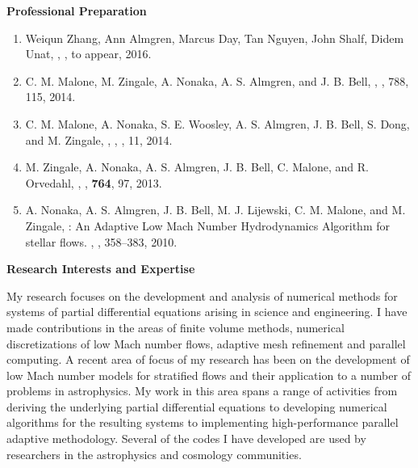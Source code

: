 \documentclass[11pt,letterpaper,english]{article}
\begin{document}
\begin{flushleft} {\bf Professional Preparation}
\begin{enumerate}
\item Weiqun Zhang, Ann Almgren, Marcus Day, Tan Nguyen, John Shalf, Didem Unat, 
, , to appear, 2016. \\

\item C. M. Malone, M. Zingale, A. Nonaka, A. S. Almgren, and J. B. Bell, 
,
, 788, 115, 2014. \\ 

\item C. M. Malone, A. Nonaka, S. E. Woosley, A. S. Almgren, J. B. Bell, S. Dong, and M. Zingale, 
,
, , 11, 2014.  \\ 

\item M. Zingale, A. Nonaka, A. S. Almgren, J. B. Bell, C. Malone, and R. Orvedahl, 
, 
, 
{\bf 764}, 97, 2013. \\ 
\item A. Nonaka, A. S. Almgren, J. B. Bell, M. J. Lijewski, C. M. Malone, and M. Zingale,
: An Adaptive Low Mach Number Hydrodynamics Algorithm for
  stellar flows.
, 
, 358--383, 2010. \\ 
\end{enumerate} 

\vspace{-6pt}
{\bf Research Interests and Expertise}
{\parindent 12pt

My research focuses on the development and analysis of numerical methods for systems of partial 
differential equations arising in science and engineering.  I have made contributions in the
areas of finite volume methods, numerical discretizations of low Mach number flows, adaptive
mesh refinement and parallel computing.  A recent area of focus of my research has been on the
development of low Mach number models for stratified flows and their application to a number
of problems in astrophysics.  My work in this area spans a range of activities from deriving the
underlying partial differential equations to developing numerical algorithms for the resulting
systems to implementing high-performance parallel adaptive methodology.  
Several of the codes I have developed are used by researchers in the
astrophysics and cosmology communities.
}


\end{flushleft}
\end{document}
